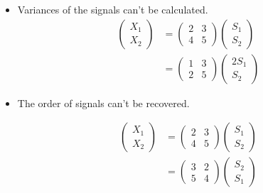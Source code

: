 \documentclass[11pt, a4paper]{article}
\begin{document}
\begin{itemize}
	\item Variances of the signals can't be calculated.
	      \begin{align*}
	      	\begin{pmatrix} 
	      	X_1 \\ 
	      	X_2 
	      	\end{pmatrix} & = 
	      	\begin{pmatrix} 
	      	2             & 3 \\ 
	      	4             & 5 
	      	\end{pmatrix}
	      	\begin{pmatrix} 
	      	S_1 \\ 
	      	S_2
	      	\end{pmatrix} \\
	      	              & = 
	      	\begin{pmatrix} 
	      	1             & 3 \\ 
	      	2             & 5 
	      	\end{pmatrix}
	      	\begin{pmatrix} 
	      	2S_1 \\ 
	      	S_2
	      	\end{pmatrix} 
	      \end{align*}
	      
	        
	\item The order of signals can't be recovered.
	       
	      \begin{align*}
	      	\begin{pmatrix} 
	      	X_1 \\ 
	      	X_2 
	      	\end{pmatrix} & = 
	      	\begin{pmatrix} 
	      	2             & 3 \\ 
	      	4             & 5 
	      	\end{pmatrix}
	      	\begin{pmatrix} 
	      	S_1 \\ 
	      	S_2
	      	\end{pmatrix} \\
	      	              & = 
	      	\begin{pmatrix} 
	      	3             & 2 \\ 
	      	5             & 4 
	      	\end{pmatrix}
	      	\begin{pmatrix} 
	      	S_2 \\ 
	      	S_1
	      	\end{pmatrix} 
	      \end{align*}
\end{itemize}
\end{document}
